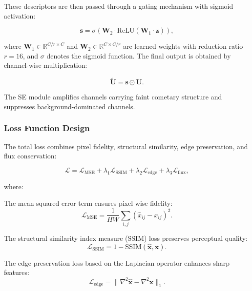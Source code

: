 \documentclass[preprint2]{aastex631}
\begin{document}
These descriptors are then passed through a gating mechanism with sigmoid activation:

\begin{equation}\label{eq:se_excitation}
\mathbf{s} = \sigma\left(\mathbf{W}_2 \cdot \text{ReLU}\left(\mathbf{W}_1 \cdot \mathbf{z}\right)\right),
\end{equation}

where $\mathbf{W}_1 \in \mathbb{R}^{C/r \times C}$ and $\mathbf{W}_2 \in \mathbb{R}^{C \times C/r}$ are learned weights with reduction ratio $r=16$, and $\sigma$ denotes the sigmoid function. The final output is obtained by channel-wise multiplication:

\begin{equation}\label{eq:se_scale}
\tilde{\mathbf{U}} = \mathbf{s} \odot \mathbf{U}.
\end{equation}

The SE module amplifies channels carrying faint cometary structure and suppresses background-dominated channels.

\subsubsection{Loss Function Design}

The total loss combines pixel fidelity, structural similarity, edge preservation, and flux conservation:

\begin{equation}\label{eq:total_loss}
\mathcal{L} = \mathcal{L}_{\text{MSE}} + \lambda_1 \mathcal{L}_{\text{SSIM}} + \lambda_2 \mathcal{L}_{\text{edge}} + \lambda_3 \mathcal{L}_{\text{flux}},
\end{equation}

where:

The mean squared error term ensures pixel-wise fidelity:
\begin{equation}\label{eq:mse_loss}
\mathcal{L}_{\text{MSE}} = \frac{1}{HW} \sum_{i,j} (\hat{x}_{ij} - x_{ij})^2.
\end{equation}

The structural similarity index measure (SSIM) loss \citep{wang04} preserves perceptual quality:
\begin{equation}\label{eq:ssim_loss}
\mathcal{L}_{\text{SSIM}} = 1 - \text{SSIM}(\hat{\mathbf{x}}, \mathbf{x}).
\end{equation}

The edge preservation loss based on the Laplacian operator enhances sharp features:
\begin{equation}\label{eq:edge_loss}
\mathcal{L}_{\text{edge}} = \|\nabla^2 \hat{\mathbf{x}} - \nabla^2 \mathbf{x}\|_1.
\end{equation}
\end{document}

